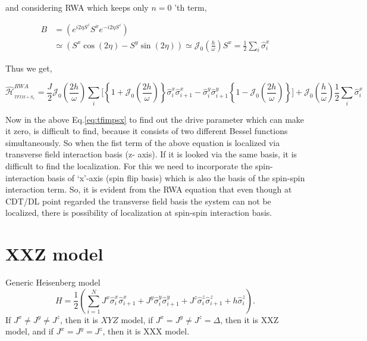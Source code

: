 \documentclass[a4paper,11pt]{article}
\begin{document}
and considering RWA which keeps only $n=0$ 'th term,

\begin{align}
B & =\left(e^{i 2 \eta S^{z}} S^{x} e^{-i 2 \eta S^{z}}\right) \nonumber\\
& \simeq\left(S^{x} \cos (2 \eta)-S^{y} \sin (2 \eta)\right) \simeq \mathcal{J}_{0}\left(\frac{h}{\omega}\right) S^{x} = \frac12\sum_i\hat{\sigma}^x_i
\label{eq:B}
\end{align}

Thus we get,

\begin{equation}
\hat{\mathcal{H}}_{_{TFIM+S_{x}}}^{R W A}=\frac{J}{2} \mathcal{J}_0\left(\frac{2h}{\omega}\right)\sum_{i}\Bigg[\left\{1+ \mathcal{J}_0\left(\frac{2h}{\omega}\right)\right\} \hat{\sigma}_{i}^{x} \hat{\sigma}_{i+1}^{x} - \hat{\sigma}^y_i\hat{\sigma}^y_{i+1}\left\{1- \mathcal{J}_0\left(\frac{2h}{\omega}\right)\right\} \Bigg] +\mathcal{J}_{0}\left(\frac{h}{\omega}\right) \frac12\sum_i\hat{\sigma}^x_i
\label{eq:tfimpsx}
\end{equation}

Now in the above Eq.\eqref{eq:tfimpsx} to find out the drive parameter which can make it zero, is difficult to find, because it consists of two different Bessel functions simultaneously. So when the fist term of the above equation is localized via transverse field interaction basis (z- axis). If it is looked via the same basis, it is difficult to find the localization. For this we need to incorporate the spin-interaction basis of `x'-axis (spin flip basis) which is also the basis of the spin-spin interaction term. So, it is evident from the RWA equation that even though at CDT/DL point regarded the transverse field basis the system can not be localized, there is possibility of localization at spin-spin interaction basis.  

\section{XXZ model}
Generic Heisenberg model
\begin{equation*}
H = \frac12 \left( \sum_{i=1}^N J^x \hat{\sigma}^x_i \hat{\sigma}^x_{i+1} +J^y  \hat{\sigma}^y_i \hat{\sigma}^y_{i+1} + J^z  \hat{\sigma}^z_i \hat{\sigma}^z_{i+1} + h  \hat{\sigma}^z_i\right).
\end{equation*}
If $J^x\neq J^y \neq J^z$, then it is $XYZ$ model, if $J^x= J^y \neq J^z=\Delta$, then it is XXZ model, and if $J^x= J^y=J^z$, then it is XXX model.
\end{document}
